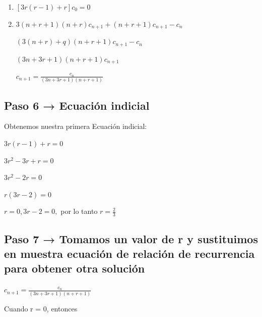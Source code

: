 \documentclass{article}
\begin{document}
\begin{enumerate}
\item\Large $ [3r (r - 1) + r] c_{0} = 0 $\newline

\item\Large $3 (n + r + 1) (n + r) c_{n+1} + (n + r + 1) c_{n+1} - c_{n}$ \newline

\Large $(3 (n + r) + q) (n + r + 1) c_{n+1} - c_{n}$\newline

\Large $(3n + 3r + 1) (n + r + 1) c_{n+1} $\newline

\LARGE $c_{n+1} = \frac{c_{n}}{(3n + 3r + 1) (n + r + 1)}$
\end{enumerate}

\subsection{ Paso 6 → Ecuación indicial}
\large Obtenemos nuestra primera Ecuación indicial:

\begin{center}
\Large $ 3r (r - 1) + r = 0 $

\Large $3r^{2} - 3r + r = 0$

\Large $3r^{2} - 2r = 0$

\Large $r (3r - 2) = 0$

\Large $r = 0,$\hspace{1cm}$ 3r - 2 = 0, $\hspace{1cm} por lo tanto $ r = \frac{2}{3}$
\end{center}

\subsection{Paso 7 → Tomamos un valor de r y sustituimos en muestra ecuación de relación de recurrencia para obtener otra solución}

\begin{center}
\LARGE $c_{n+1} = \frac{c_{n}}{(3n + 3r + 1) (n + r + 1)}$\newline
\end{center}

\Large Cuando r = 0, entonces
\end{document}
